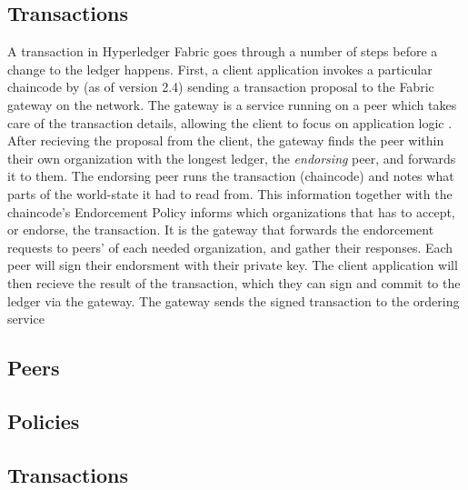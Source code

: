 \documentclass[english, biblatex, digitaloutput]{kththesis}
\begin{document}



\subsection{Transactions}

A transaction in Hyperledger Fabric goes through a number of steps before a change to the ledger happens. First, a client application invokes a particular chaincode by (as of version 2.4) sending a transaction proposal to the Fabric gateway on the network. The gateway is a service running on a peer which takes care of the transaction details, allowing the client to focus on application logic \cite{fabric_gateway_2022}. After recieving the proposal from the client, the gateway finds the peer within their own organization with the longest ledger, the \textit{endorsing} peer, and forwards it to them. The endorsing peer runs the transaction (\ie chaincode) and notes what parts of the world-state it had to read from. This information together with the chaincode's Endorcement Policy informs which organizations that has to accept, or endorse, the transaction. It is the gateway that forwards the endorcement requests to peers' of each needed organization, and gather their responses. Each peer will sign their endorsment with their private key. The client application will then recieve the result of the transaction, which they can sign and commit to the ledger via the gateway. The gateway sends the signed transaction to the ordering service 

\subsection{Peers}

\subsection{Policies}

\subsection{Transactions}
\end{document}
